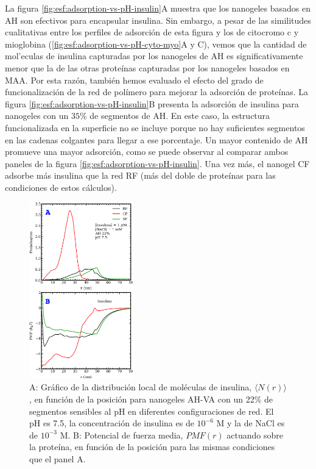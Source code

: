 La figura \ref{fig:esf:adsorption-vs-pH-insulin}A muestra que los nanogeles basados en AH son efectivos para encapsular insulina.
Sin embargo, a pesar de las similitudes cualitativas entre los perfiles de adsorci\'on de esta figura y los de citocromo c y mioglobina (\ref{fig:esf:adsorption-vs-pH-cyto-myo}A y C), vemos que la cantidad de mol'eculas de insulina capturadas por los nanogeles de AH es significativamente menor que la de las otras prote\'inas capturadas por los nanogeles basados en MAA.
Por esta raz\'on, tambi\'en hemos evaluado el efecto del grado de funcionalizaci\'on de la red de pol\'imero para mejorar la adsorci\'on de prote\'inas.
La figura \ref{fig:esf:adsorption-vs-pH-insulin}B presenta la adsorci\'on de insulina para nanogeles con un $35\%$ de segmentos de AH.
En este caso, la estructura funcionalizada en la superficie no se incluye porque no hay suficientes segmentos en las cadenas colgantes para llegar a ese porcentaje.
Un mayor contenido de AH promueve una mayor adsorci\'on, como se puede observar al comparar ambos paneles de la figura \ref{fig:esf:adsorption-vs-pH-insulin}.
Una vez m\'as, el nanogel CF adsorbe m\'as insulina que la red RF (m\'as del doble de prote\'inas para las condiciones de estos c\'alculos).




\begin{figure}[!htb]
    \centering
    \includegraphics[width=0.40\textwidth]{Figures/graphs-gel2/insu-ads-pmf.pdf} 
    \caption{A: Gr\'afico de la distribuci\'on local de mol\'eculas de insulina, $\langle N(r) \rangle$, en funci\'on de la posici\'on para nanogeles AH-VA con un 22\% de segmentos sensibles al pH en diferentes configuraciones de red.
    	El pH es 7.5, la concentraci\'on de insulina es de $10^{-6}$ M y la de NaCl es de $10^{-3}$ M.
    	B: Potencial de fuerza media, ${PMF}(r)$ actuando sobre la prote\'ina, en funci\'on de la posici\'on para las mismas condiciones que el panel A.}
    \label{fig:esf:adsorption-vs-r-insulin}
\end{figure}



